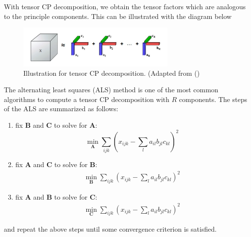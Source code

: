 With tensor CP decomposition, we obtain the tensor factors which are analogous to the principle components. This can be illustrated with the diagram below
\begin{figure}[H]
    \centering
        \includegraphics[width=0.7\textwidth]{figures/linear/tca.jpg}
        \caption{Illustration for tensor CP decomposition. (Adapted from (\cite{williams_unsupervised_2018})}
    \end{figure} 
    
The alternating least squares (ALS) method is one of the most common algorithms to compute a tensor CP decomposition with $R$ components. The steps of the ALS are summarized as follows: 
\begin{enumerate}
    \item fix  $\mathbf{B}$ and  $\mathbf{C}$ to solve for $\mathbf{A}$: 
     \begin{equation}
       \min_{\mathbf{A}} \sum_{i j k}\left(x_{i j k} - \sum_l a_{i l} b_{j l} c_{k l}\right)^2
     \end{equation}
    \item fix $\mathbf{A}$ and  $\mathbf{C}$ to solve for  $\mathbf{B}$:
  \begin{align}
       \min_{\mathbf{B}} \sum_{i j k}\left(x_{i j k} - \sum_l a_{i l}  b_{j l} c_{k l}\right)^2
     \end{align}
 \item fix $\mathbf{A}$ and  $\mathbf{B}$ to solve for $\mathbf{C}$: 
 \begin{align}
       \min_{\mathbf{C}} \sum_{i j k}\left(x_{i j k} - \sum_l a_{i l}  b_{j l} c_{k l}\right)^2
     \end{align}
\end{enumerate} 
and repeat the above steps until some convergence criterion is satisfied. 

